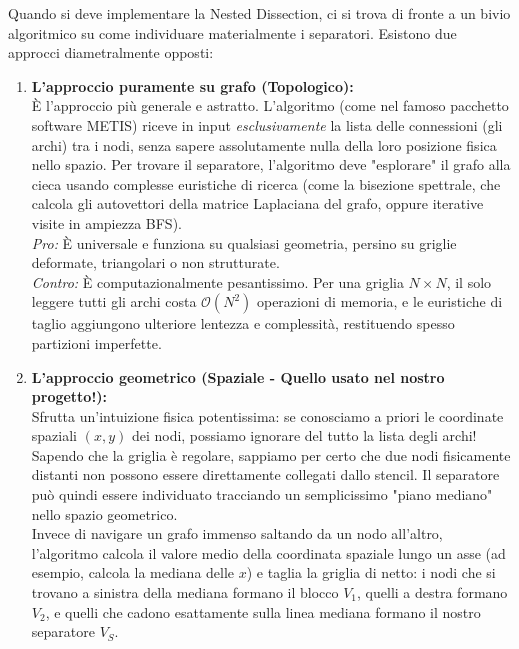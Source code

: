 \documentclass[a4paper,11pt]{article}
\theoremstyle{definition}
\begin{document}
Quando si deve implementare la Nested Dissection, ci si trova di fronte a un bivio algoritmico su come individuare materialmente i separatori. Esistono due approcci diametralmente opposti:

\begin{enumerate}
  \item \textbf{L'approccio puramente su grafo (Topologico):}\\
  È l'approccio più generale e astratto. L'algoritmo (come nel famoso pacchetto software METIS) riceve in input \emph{esclusivamente} la lista delle connessioni (gli archi) tra i nodi, senza sapere assolutamente nulla della loro posizione fisica nello spazio. Per trovare il separatore, l'algoritmo deve "esplorare" il grafo alla cieca usando complesse euristiche di ricerca (come la bisezione spettrale, che calcola gli autovettori della matrice Laplaciana del grafo, oppure iterative visite in ampiezza BFS). \\
  \textit{Pro:} È universale e funziona su qualsiasi geometria, persino su griglie deformate, triangolari o non strutturate.\\
  \textit{Contro:} È computazionalmente pesantissimo. Per una griglia $N \times N$, il solo leggere tutti gli archi costa $\mathcal{O}(N^2)$ operazioni di memoria, e le euristiche di taglio aggiungono ulteriore lentezza e complessità, restituendo spesso partizioni imperfette.

  \item \textbf{L'approccio geometrico (Spaziale - Quello usato nel nostro progetto!):}\\
  Sfrutta un'intuizione fisica potentissima: se conosciamo a priori le coordinate spaziali $(x,y)$ dei nodi, possiamo ignorare del tutto la lista degli archi! Sapendo che la griglia è regolare, sappiamo per certo che due nodi fisicamente distanti non possono essere direttamente collegati dallo stencil. Il separatore può quindi essere individuato tracciando un semplicissimo "piano mediano" nello spazio geometrico.\\
  Invece di navigare un grafo immenso saltando da un nodo all'altro, l'algoritmo calcola il valore medio della coordinata spaziale lungo un asse (ad esempio, calcola la mediana delle $x$) e taglia la griglia di netto: i nodi che si trovano a sinistra della mediana formano il blocco $V_1$, quelli a destra formano $V_2$, e quelli che cadono esattamente sulla linea mediana formano il nostro separatore $V_S$.
\end{enumerate}
\end{document}
